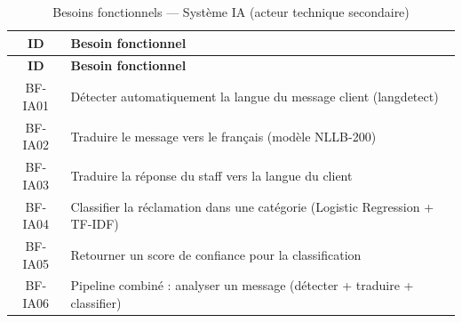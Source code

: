 \begin{longtable}{|c|p{12cm}|}
\caption{Besoins fonctionnels — Système IA (acteur technique secondaire)} \label{tab:bf_ia} \\
\hline
\textbf{ID} & \textbf{Besoin fonctionnel} \\
\hline
\endfirsthead
\hline
\textbf{ID} & \textbf{Besoin fonctionnel} \\
\hline
\endhead
BF-IA01 & Détecter automatiquement la langue du message client (langdetect) \\
\hline
BF-IA02 & Traduire le message vers le français (modèle NLLB-200) \\
\hline
BF-IA03 & Traduire la réponse du staff vers la langue du client \\
\hline
BF-IA04 & Classifier la réclamation dans une catégorie (Logistic Regression + TF-IDF) \\
\hline
BF-IA05 & Retourner un score de confiance pour la classification \\
\hline
BF-IA06 & Pipeline combiné : analyser un message (détecter + traduire + classifier) \\
\hline
\end{longtable}
